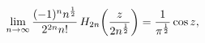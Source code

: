 \[\lim_{n\to\infty}\frac{(-1)^{n}n^{\frac{1}{2}}}{2^{2n}n!}\mathop{H_{2n}\/}%
\nolimits\!\left(\frac{z}{2n^{\frac{1}{2}}}\right)=\frac{1}{\pi^{\frac{1}{2}}}%
\mathop{\cos\/}\nolimits z,\]